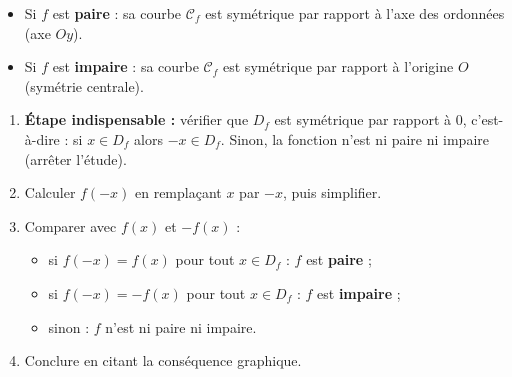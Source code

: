 \documentclass[11pt]{article}
\newcommand{\cle}[1]{{\popxbold\color{popdark}#1}}
\begin{document}
\begin{propriete}
\begin{itemize}
\item Si $f$ est \textbf{paire} : sa courbe $\mathcal{C}_f$ est symétrique par rapport à l'axe des ordonnées (axe $Oy$).
\item Si $f$ est \textbf{impaire} : sa courbe $\mathcal{C}_f$ est symétrique par rapport à l'origine $O$ (symétrie centrale).
\end{itemize}
\end{propriete}

\begin{methode}
\begin{enumerate}
\item \textbf{Étape indispensable :} vérifier que $D_f$ est \cle{symétrique par rapport à 0}, c'est-à-dire : si $x \in D_f$ alors $-x \in D_f$. Sinon, la fonction n'est ni paire ni impaire (arrêter l'étude).
\item Calculer $f(-x)$ en remplaçant $x$ par $-x$, puis simplifier.
\item Comparer avec $f(x)$ et $-f(x)$ :
\begin{itemize}
\item si $f(-x) = f(x)$ pour tout $x \in D_f$ : $f$ est \textbf{paire} ;
\item si $f(-x) = -f(x)$ pour tout $x \in D_f$ : $f$ est \textbf{impaire} ;
\item sinon : $f$ n'est ni paire ni impaire.
\end{itemize}
\item Conclure en citant la conséquence graphique.
\end{enumerate}
\end{methode}
\end{document}
